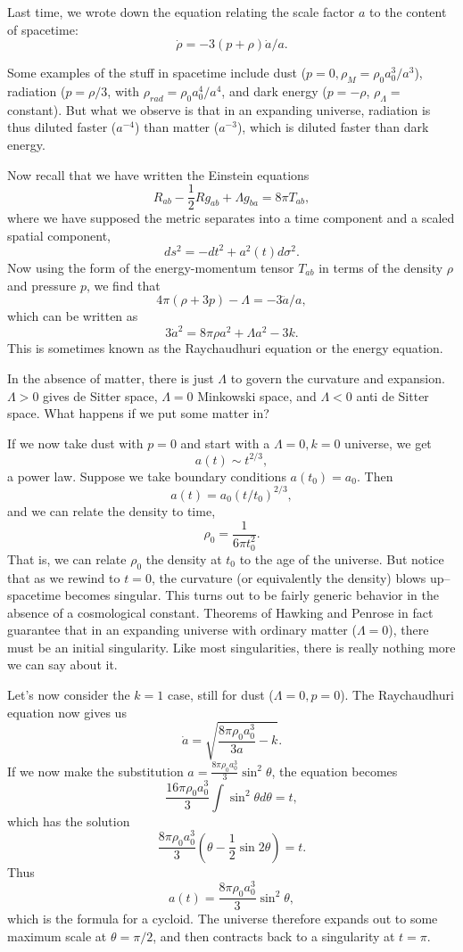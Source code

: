 Last time, we wrote down the equation relating the scale factor $a$ to the content of spacetime:
$$\dot \rho = -3(p+\rho)\dot a/a.$$

Some examples of the stuff in spacetime include dust ($p=0,\rho_M=\rho_0 a_0^3/a^3$), radiation ($p=\rho/3$, with $\rho_{rad}=\rho_0 a_0^4/a^4$, and dark energy ($p=-\rho$, $\rho_\Lambda=$constant).
But what we observe is that in an expanding universe, radiation is thus diluted faster ($a^{-4}$) than matter ($a^{-3}$), which is diluted faster than dark energy.

Now recall that we have written the Einstein equations
$$R_{ab}-\frac{1}{2}R g_{ab}+\Lambda g_{ba}=8\pi T_{ab},$$
where we have supposed the metric separates into a time component and a scaled spatial component,
$$ds^2=-dt^2+a^2(t) d\sigma^2.$$
Now using the form of the energy-momentum tensor $T_{ab}$ in terms of the density $\rho$ and pressure $p$, we find that
$$4\pi(\rho+3p)-\Lambda=-3\ddot a/a,$$
which can be written as
$$3\dot a^2=8\pi \rho a^2 +\Lambda a^2 -3k.$$
This is sometimes known as the Raychaudhuri equation or the energy equation.%

In the absence of matter, there is just $\Lambda$ to govern the curvature and expansion. $\Lambda >0$ gives de Sitter space, $\Lambda=0$ Minkowski space, and $\Lambda <0$ anti de Sitter space. What happens if we put some matter in?

If we now take dust with $p=0$ and start with a $\Lambda=0,k=0$ universe, we get
$$a(t)\sim t^{2/3},$$
a power law. Suppose we take boundary conditions $a(t_0)=a_0.$ Then
$$a(t)=a_0 (t/t_0)^{2/3},$$
and we can relate the density to time,
$$\rho_0=\frac{1}{6\pi t_0^2}.$$
That is, we can relate $\rho_0$ the density at $t_0$ to the age of the universe. But notice that as we rewind to $t=0$, the curvature (or equivalently the density) blows up-- spacetime becomes singular. This turns out to be fairly generic behavior in the absence of a cosmological constant. Theorems of Hawking and Penrose in fact guarantee that in an expanding universe with ordinary matter ($\Lambda=0$), there must be an initial singularity. %
Like most singularities, there is really nothing more we can say about it.

Let's now consider the $k=1$ case, still for dust ($\Lambda=0,p=0$). The Raychaudhuri equation now gives us
$$\dot a=\sqrt{\frac{8\pi \rho_0 a_0^3}{3a}-k}.$$ If we now make the substitution $a=\frac{8\pi \rho_0 a_0^3}{3}\sin^2\theta$, the equation becomes
$$\frac{16\pi \rho_0 a_0^3}{3} \int \sin^2\theta d\theta =t,$$
which has the solution
$$\frac{8\pi \rho_0 a_0^3}{3}(\theta-\frac{1}{2}\sin 2\theta)=t.$$ Thus
$$a(t)=\frac{8\pi \rho_0 a_0^3}{3}\sin^2\theta,$$
which is the formula for a cycloid. The universe therefore expands out to some maximum scale at $\theta=\pi/2$, and then contracts back to a singularity at $t=\pi$.

